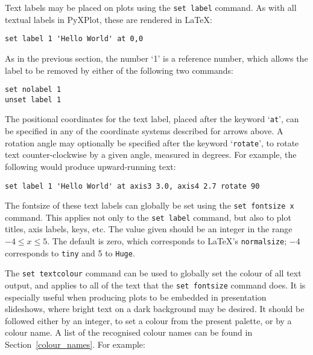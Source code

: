 \documentclass[a4paper,onecolumn,11pt]{book}
\begin{document}
Text labels may be placed on plots using the \texttt{set label}
command. As with all
textual labels in PyXPlot, these are rendered in \LaTeX:

\begin{verbatim}
set label 1 'Hello World' at 0,0
\end{verbatim}

As in the previous section, the number `1' is a reference number, which allows
the label to be removed by either of the following two commands:

\begin{verbatim}
set nolabel 1
unset label 1
\end{verbatim}

\noindent The positional coordinates for the text label, placed after the
keyword `\texttt{at}', can be specified in any of the coordinate systems
described for arrows above. A rotation angle may optionally be specified after
the keyword `{\tt rotate}', to rotate text counter-clockwise by a given
angle, measured in degrees. For example, the following would produce
upward-running text:

\begin{verbatim}
set label 1 'Hello World' at axis3 3.0, axis4 2.7 rotate 90
\end{verbatim}

 The fontsize of these text labels can globally be set using
the \texttt{set fontsize x} command. This applies not only to the \texttt{set
label} command, but also to plot titles, axis labels, keys, etc. The value
given should be an integer in the range $-4 \leq x \leq 5$. The default is
zero, which corresponds to \LaTeX's \texttt{normalsize}; $-4$ corresponds to
\texttt{tiny} and 5 to \texttt{Huge}.

 The \texttt{set textcolour} command
can be used to globally set the colour of all text output, and applies to all
of the text that the \texttt{set fontsize} command does. It is especially
useful when producing plots to be embedded in presentation slideshows, where
bright text on a dark background may be desired. It should be followed either
by an integer, to set a colour from the present palette, or by a colour name. A
list of the recognised colour names can be found in Section~\ref{colour_names}.
For example:
\end{document}
